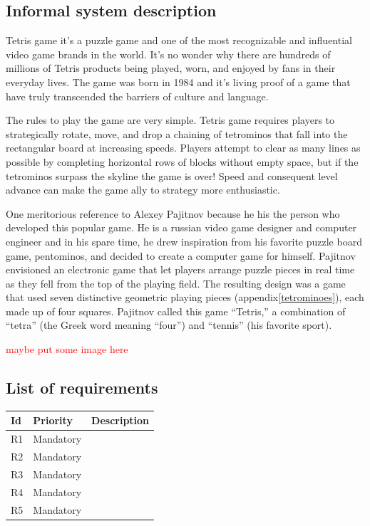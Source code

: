 \documentclass[a4paper]{article}
\begin{document}
\subsection{Informal system description}

Tetris game it's a puzzle game and one of the most recognizable and influential video game brands in the world. It’s no wonder why there are hundreds of millions of Tetris products being played, worn, and enjoyed by fans in their everyday lives. The game was born in 1984 and it's living proof of a game that have truly transcended the barriers of culture and language.

The rules to play the game are very simple. Tetris game requires players to strategically rotate, move, and drop a chaining of tetrominos that fall into the rectangular board at increasing speeds. Players attempt to clear as many lines as possible by completing horizontal rows of blocks without empty space, but if the tetrominos surpass the skyline the game is over! Speed and consequent level advance can make the game ally to strategy more enthusiastic.

One meritorious reference to Alexey Pajitnov because he his the person who developed this popular game. He is a russian video game designer and computer engineer and in his spare time, he drew inspiration from his favorite puzzle board game, pentominos, and decided to create a computer game for himself. Pajitnov envisioned an electronic game that let players arrange puzzle pieces in real time as they fell from the top of the playing field. The resulting design was a game that used seven distinctive geometric playing pieces (appendix\ref{tetrominoes}), each made up of four squares. Pajitnov called this game “Tetris,” a combination of “tetra” (the Greek word meaning “four”) and “tennis” (his favorite sport).

\textcolor{red}{maybe put some image here}
\subsection{List of requirements}

\begin{table}[h]
	\centering
	\label{list-of-requirements}
	\begin{tabular}{|l|l|l|}
		\hline
		\textbf{Id} & \textbf{Priority} & \textbf{Description} \\ \hline
		R1 & Mandatory         &                      \\ \hline
		R2 & Mandatory         &                      \\ \hline
		R3 & Mandatory         &                      \\ \hline
		R4 & Mandatory         &                      \\ \hline
		R5 & Mandatory         &                      \\ \hline
	\end{tabular}
\end{table}
\end{document}
